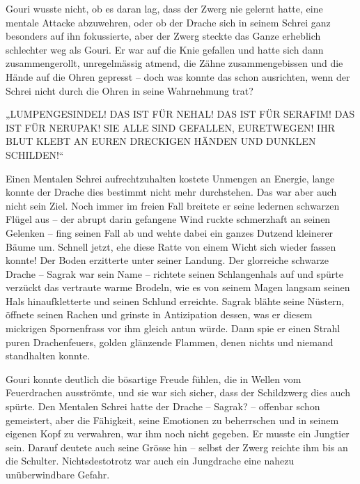 \documentclass[10pt, a4paper, oneside]{book}
\begin{document}
Gouri wusste nicht, ob es daran lag, dass der Zwerg nie gelernt hatte, eine mentale Attacke abzuwehren, oder ob der Drache sich in seinem Schrei ganz besonders auf ihn fokussierte, aber der Zwerg steckte das Ganze erheblich schlechter weg als Gouri. Er war auf die Knie gefallen und hatte sich dann zusammengerollt, unregelmässig atmend, die Zähne zusammengebissen und die Hände auf die Ohren gepresst – doch was konnte das schon ausrichten, wenn der Schrei nicht durch die Ohren in seine Wahrnehmung trat?

„LUMPENGESINDEL! DAS IST FÜR NEHAL! DAS IST FÜR SERAFIM! DAS IST FÜR NERUPAK! SIE ALLE SIND GEFALLEN, EURETWEGEN! IHR BLUT KLEBT AN EUREN DRECKIGEN HÄNDEN UND DUNKLEN SCHILDEN!“

Einen Mentalen Schrei aufrechtzuhalten kostete Unmengen an Energie, lange konnte der Drache dies bestimmt nicht mehr durchstehen. Das war aber auch nicht sein Ziel. Noch immer im freien Fall breitete er seine ledernen schwarzen Flügel aus – der abrupt darin gefangene Wind ruckte schmerzhaft an seinen Gelenken – fing seinen Fall ab und wehte dabei ein ganzes Dutzend kleinerer Bäume um. Schnell jetzt, ehe diese Ratte von einem Wicht sich wieder fassen konnte! Der Boden erzitterte unter seiner Landung. Der glorreiche schwarze Drache – Sagrak war sein Name – richtete seinen Schlangenhals auf und spürte verzückt das vertraute warme Brodeln, wie es von seinem Magen langsam seinen Hals hinaufkletterte und seinen Schlund erreichte. Sagrak blähte seine Nüstern, öffnete seinen Rachen und grinste in Antizipation dessen, was er diesem mickrigen Spornenfrass vor ihm gleich antun würde. Dann spie er einen Strahl puren Drachenfeuers, golden glänzende Flammen, denen nichts und niemand standhalten konnte.

Gouri konnte deutlich die bösartige Freude fühlen, die in Wellen vom Feuerdrachen ausströmte, und sie war sich sicher, dass der Schildzwerg dies auch spürte. Den Mentalen Schrei hatte der Drache – Sagrak? – offenbar schon gemeistert, aber die Fähigkeit, seine Emotionen zu beherrschen und in seinem eigenen Kopf zu verwahren, war ihm noch nicht gegeben. Er musste ein Jungtier sein. Darauf deutete auch seine Grösse hin – selbst der Zwerg reichte ihm bis an die Schulter. Nichtsdestotrotz war auch ein Jungdrache eine nahezu unüberwindbare Gefahr.
\end{document}
